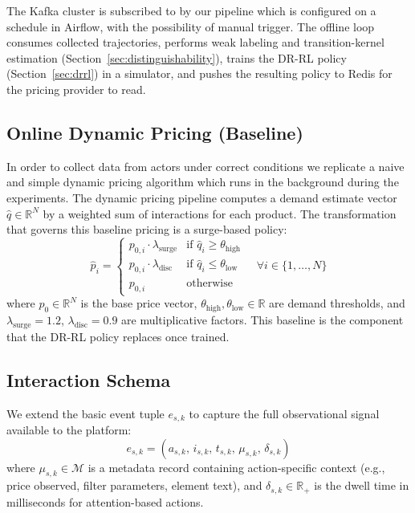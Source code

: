 \documentclass[sigconf]{acmart}
\begin{document}
The Kafka cluster is subscribed to by our pipeline which is configured on a schedule in Airflow, with the possibility of manual trigger. The offline loop consumes collected trajectories, performs weak labeling and transition-kernel estimation (Section~\ref{sec:distinguishability}), trains the DR-RL policy (Section~\ref{sec:drrl}) in a simulator, and pushes the resulting policy to Redis for the pricing provider to read.

\subsection{Online Dynamic Pricing (Baseline)}

In order to collect data from actors under correct conditions we replicate a naive and simple dynamic pricing algorithm which runs in the background during the experiments. The dynamic pricing pipeline computes a demand estimate vector $\hat{q} \in \mathbb{R}^N$ by a weighted sum of interactions for each product. The transformation that governs this baseline pricing is a surge-based policy:
\begin{equation}
\hat{p}_i = \begin{cases}
p_{0,i} \cdot \lambda_{\text{surge}} & \text{if } \hat{q}_i \geq \theta_{\text{high}} \\
p_{0,i} \cdot \lambda_{\text{disc}} & \text{if } \hat{q}_i \leq \theta_{\text{low}} \\
p_{0,i} & \text{otherwise}
\end{cases}
\quad \forall i \in \{1, \ldots, N\}
\end{equation}
where $p_0 \in \mathbb{R}^N$ is the base price vector, $\theta_{\text{high}}, \theta_{\text{low}} \in \mathbb{R}$ are demand thresholds, and $\lambda_{\text{surge}} = 1.2$, $\lambda_{\text{disc}} = 0.9$ are multiplicative factors. This baseline is the component that the DR-RL policy replaces once trained.

\subsection{Interaction Schema}

We extend the basic event tuple $e_{s,k}$ to capture the full observational signal available to the platform:
\begin{equation}
e_{s,k} = \left( a_{s,k}, \, i_{s,k}, \, t_{s,k}, \, \mu_{s,k}, \, \delta_{s,k} \right)
\end{equation}
where $\mu_{s,k} \in \mathcal{M}$ is a metadata record containing action-specific context (e.g., price observed, filter parameters, element text), and $\delta_{s,k} \in \mathbb{R}_+$ is the dwell time in milliseconds for attention-based actions.
\end{document}
